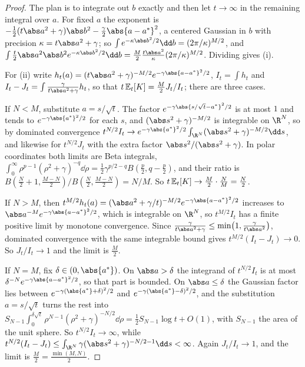 \begin{refsection}
\begin{proof}
The plan is to integrate out $b$ exactly and then let $t\to\infty$ in the remaining integral over $a$. For fixed $a$ the exponent is $-\frac12(t\abs a^2+\gamma)\abs b^2-\frac\gamma2\abs{a-a^*}^2$, a centered Gaussian in $b$ with precision $\kappa=t\abs a^2+\gamma$; so $\int e^{-\kappa\abs b^2/2}\dd b=(2\pi/\kappa)^{M/2}$, and $\int\frac t2\abs a^2\abs b^2e^{-\kappa\abs b^2/2}\dd b=\frac M2\frac{t\abs a^2}\kappa(2\pi/\kappa)^{M/2}$. Dividing gives (i).

For (ii) write $h_t(a)=(t\abs a^2+\gamma)^{-M/2}e^{-\gamma\abs{a-a^*}^2/2}$, $I_t=\int h_t$ and $I_t-J_t=\int\frac\gamma{t\abs a^2+\gamma}h_t$, so that $t\,\mathbb{E}_{t}\!\left[K\right]=\frac M2J_t/I_t$; there are three cases.

If $N<M$, substitute $a=s/\sqrt t$. The factor $e^{-\gamma\abs{s/\sqrt t-a^*}^2/2}$ is at most $1$ and tends to $e^{-\gamma\abs{a^*}^2/2}$ for each $s$, and $(\abs s^2+\gamma)^{-M/2}$ is integrable on $\R^N$, so by dominated convergence $t^{N/2}I_t\to e^{-\gamma\abs{a^*}^2/2}\int_{\R^N}(\abs s^2+\gamma)^{-M/2}\dd s$, and likewise for $t^{N/2}J_t$ with the extra factor $\abs s^2/(\abs s^2+\gamma)$. In polar coordinates both limits are Beta integrals, $\int_0^\infty\rho^{p-1}(\rho^2+\gamma)^{-q}\dd\rho=\tfrac12\gamma^{p/2-q}B(\tfrac p2,q-\tfrac p2)$, and their ratio is $B(\tfrac N2+1,\tfrac{M-N}2)/B(\tfrac N2,\tfrac{M-N}2)=N/M$. So $t\,\mathbb{E}_{t}\!\left[K\right]\to\frac M2\cdot\frac NM=\frac N2$.

If $N>M$, then $t^{M/2}h_t(a)=(\abs a^2+\gamma/t)^{-M/2}e^{-\gamma\abs{a-a^*}^2/2}$ increases to $\abs a^{-M}e^{-\gamma\abs{a-a^*}^2/2}$, which is integrable on $\R^N$, so $t^{M/2}I_t$ has a finite positive limit by monotone convergence. Since $\frac\gamma{t\abs a^2+\gamma}\le\min\bigl(1,\frac\gamma{t\abs a^2}\bigr)$, dominated convergence with the same integrable bound gives $t^{M/2}(I_t-J_t)\to0$. So $J_t/I_t\to1$ and the limit is $\frac M2$.

If $N=M$, fix $\delta\in(0,\abs{a^*})$. On $\abs a>\delta$ the integrand of $t^{N/2}I_t$ is at most $\delta^{-N}e^{-\gamma\abs{a-a^*}^2/2}$, so that part is bounded. On $\abs a\le\delta$ the Gaussian factor lies between $e^{-\gamma(\abs{a^*}+\delta)^2/2}$ and $e^{-\gamma(\abs{a^*}-\delta)^2/2}$, and the substitution $a=s/\sqrt t$ turns the rest into $S_{N-1}\int_0^{\delta\sqrt t}\rho^{N-1}(\rho^2+\gamma)^{-N/2}\dd\rho=\tfrac12S_{N-1}\log t+O(1)$, with $S_{N-1}$ the area of the unit sphere. So $t^{N/2}I_t\to\infty$, while $t^{N/2}(I_t-J_t)\le\int_{\R^N}\gamma(\abs s^2+\gamma)^{-N/2-1}\dd s<\infty$. Again $J_t/I_t\to1$, and the limit is $\frac M2=\frac{\min(M,N)}2$.
\end{proof}


\end{refsection}
